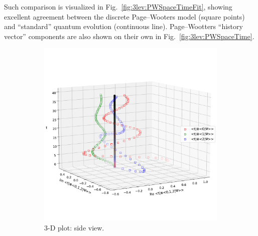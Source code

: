 Such comparison is visualized in Fig.~\ref{fig:3lev:PWSpaceTimeFit},
showing excellent agreement between the discrete Page--Wooters model (square points)
and ``standard'' quantum evolution (continuous line).
Page--Wootters ``history vector'' components are also shown on their own
in Fig.~\ref{fig:3lev:PWSpaceTime}. 

\begin{figure}[h]
  \begin{subfigure}[b]{\textwidth}
    \centering
    \includegraphics[height=0.41\textheight,clip,trim=0 90 0 140]{img/3ldetect/PWSpaceTime_side.pdf}
    \caption{3-D plot: side view.}
  \end{subfigure}
  \par\bigskip
  \begin{subfigure}[b]{\textwidth}
    \centering

\end{subfigure}
\end{figure}
